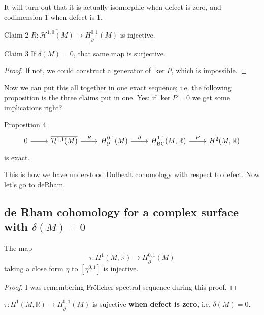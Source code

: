 It will turn out that it is actually isomorphic when defect is zero, and codimension 1 when defect is 1.

\begin{thing6}{Claim 2}\leavevmode
\(R:\overline{\mathcal{H}^{1,0}(M)} \to H^{0,1}_{\bar\partial}(M)\) is injective.
\end{thing6}

\begin{thing7}{Claim 3}\leavevmode
If \(\delta(M)=0\), that same map is surjective.
\end{thing7}

\begin{proof}\leavevmode
If not, we could construct a generator of \(\ker P\), which is impossible.
\end{proof}

Now we can put this all together in one exact sequence; i.e. the following proposition is the three claims put in one. Yes: if \(\ker P=0\) we get some implications right?

\begin{thing4}{Proposition 4}\leavevmode
\[\begin{tikzcd}0\arrow[r]&\overline{\mathcal{H}^{1,1}(M)}\arrow[r,"R"]&H^{0,1}_\partial (M)\arrow[r,"\partial "]&H^{1,1}_{\operatorname{BC}}(M,\mathbb{R})\arrow[r,"P"]&H^{2}(M,\mathbb{R})\end{tikzcd}\]
is exact.
\end{thing4}

{\color{7}This is how we have understood Dolbealt cohomology with respect to defect.} Now let's go to deRham.

\subsection{de Rham cohomology for a complex surface with \(\delta (M)=0\)}

\begin{prop}\leavevmode
The map
\[\tau: H^{1}(M,\mathbb{R})\to H^{0,1}_{\bar{\partial}}(M)\]
taking a close form \(\eta\) to \([\eta^{0,1}]\) is injective.
\end{prop}

\begin{proof}\leavevmode
I was remembering Frölicher spectral sequence during this proof.
\end{proof}

\begin{claim}\leavevmode
\(\tau: H^{1}(M,\mathbb{R})\to H^{0,1}_{\bar{\partial}}(M)\) is sujective \textbf{when defect is zero}, i.e.  \(\delta (M)=0\).
\end{claim}


